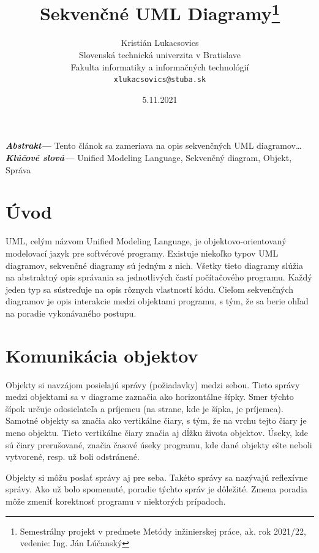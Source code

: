 \documentclass[10pt,slovak,a4paper]{article}
\title{Sekvenčné UML Diagramy\thanks{Semestrálny projekt v predmete Metódy inžinierskej práce, ak. rok 2021/22, vedenie: Ing. Ján Lúčanský}}
\author{Kristián Lukacsovics\\[2pt]
    {\small Slovenská technická univerzita v Bratislave}\\
    {\small Fakulta informatiky a informačných technológií}\\
    {\small \texttt{xlukacsovics@stuba.sk}}
    }
\date{\small 5.11.2021} %
\providecommand{\abstr}[1]{\textbf{\textit{Abstrakt---}} #1}
\providecommand{\keywords}[1]{\textbf{\textit{Klúčové slová---}} #1}
\begin{document}
\maketitle

\abstr{Tento článok sa zameriava na opis sekvenčných UML diagramov\ldots\newline}
\indent\keywords{Unified Modeling Language, Sekvenčný diagram, Objekt, Správa}

\section{Úvod}
UML, celým názvom Unified Modeling Language, je objektovo-orientovaný modelovací jazyk pre softvérové programy. \cite{eriksson98}
Existuje niekoľko typov UML diagramov, sekvenčné diagramy sú jedným z nich. Všetky tieto diagramy slúžia na
abstraktný opis správania sa jednotlivých častí počítačového programu. Každý jeden typ sa sústreďuje na opis
rôznych vlastností kódu. Cieľom sekvenčných diagramov je opis interakcie medzi objektami programu, s tým, že sa
berie ohľad na poradie vykonávaného postupu. \cite{petraq14}

\section{Komunikácia objektov} \label{nejaka}

\noindent Objekty si navzájom posielajú správy (požiadavky) medzi sebou. Tieto
správy medzi objektami sa v diagrame zaznačia ako horizontálne šípky. Smer týchto šípok určuje odosielateľa a
príjemcu (na strane, kde je šípka, je príjemca). Samotné objekty sa značia ako vertikálne čiary, s tým, že
na vrchu tejto čiary je meno objektu. Tieto vertikálne čiary značia aj dĺžku života objektov. Úseky, kde sú
čiary prerušované, značia časové úseky programu, kde dané objekty ešte neboli vytvorené, resp. už boli odstránené. \newline

\noindent Objekty si môžu poslať správy aj pre seba. Takéto správy sa nazývajú reflexívne správy. 
Ako už bolo spomenuté, poradie týchto správ je dôležité. Zmena poradia môže zmeniť korektnosť programu
v niektorých prípadoch. \cite{petraq14}  \newline
\end{document}
